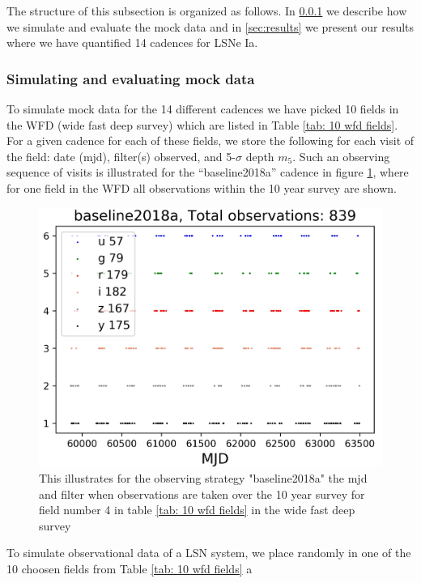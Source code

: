 The structure of this subsection is organized as follows. In
\ref{sec:simulation of mock data} we describe how we simulate and
evaluate the mock data and in \ref{sec:results} we present our results
where we have quantified 14 cadences for LSNe Ia.

\subsubsection{Simulating and evaluating mock data}
\label{sec:simulation of mock data}
To simulate mock data for the 14 different cadences we have picked 10
fields in the WFD (wide fast deep survey) which are listed in Table
\ref{tab: 10 wfd fields}. For a given cadence for each of these
fields, we store the following for each visit of the field: date
(mjd), filter(s) observed, and 5-$\sigma$ depth $m_5$. Such an
observing sequence of visits is illustrated for the ``baseline2018a''
cadence in figure \ref{fig:observation patter LSST 10 year survey},
where for one field in the WFD all observations within the 10 year
survey are shown. 
%
\begin{figure}
\centering
\includegraphics[scale=0.7]{figures/field_number3_baseline2018a_Daniel.jpg}
\caption{This illustrates for the observing strategy "baseline2018a" the mjd and filter when observations are taken over the 10 year survey for field number 4 in table \ref{tab: 10 wfd fields} in the wide fast deep survey}
\label{fig:observation patter LSST 10 year survey}
\end{figure}
%
\FloatBarrier 
To simulate observational data of a LSN system, we place randomly in
one of the 10 choosen fields from Table \ref{tab: 10 wfd fields} a

